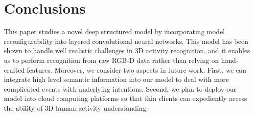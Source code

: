 \documentclass{sig-alternate}
\begin{document}
\section{Conclusions}

This paper studies a novel deep structured model by incorporating model reconfigurability into layered convolutional neural networks. This model has been shown to handle well realistic challenges in 3D activity recognition, and it enables us to perform recognition from raw RGB-D data rather than relying on hand-crafted features. Moreover, we consider two aspects in future work. First, we can integrate high level semantic information into our model to deal with more complicated events with underlying intentions. Second, we plan to deploy our model into cloud computing platforms so that thin clients can expediently access the ability of 3D human activity understanding.
%
%
\end{document}
